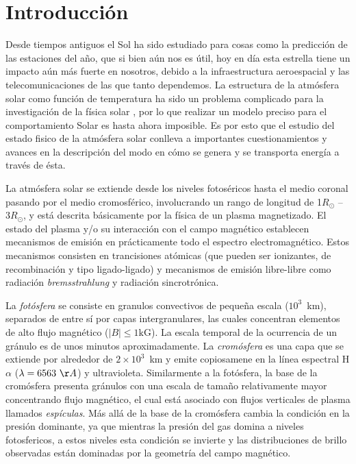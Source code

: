 \documentclass[9pt]{book}
\begin{document}
  \renewcommand{\thepage}{\arabic{page}}
  \setcounter{page}{1}
  \renewcommand{\tablename}{Tabla}

 \chapter{Introducci\'on}


Desde tiempos antiguos el Sol ha sido estudiado para cosas como la predicci\'on de las estaciones del a\~no, que si bien a\'un nos es \'util, hoy en d\'ia esta estrella tiene un impacto a\'un m\'as fuerte en nosotros, debido a la infraestructura aeroespacial y las telecomunicaciones de las que tanto dependemos. La estructura de la atm\'osfera solar como funci\'on de temperatura ha sido un problema complicado para la investigaci\'on de la f\'isica solar \cite{VAULT1}, por lo que realizar un modelo preciso para el comportamiento Solar es hasta ahora imposible. Es por esto que el estudio del estado fisico de la atm\'osfera solar conlleva a importantes cuestionamientos y avances en la descripci\'on del modo en c\'omo se genera y se transporta energ\'ia a trav\'es de \'esta.

La atm\'osfera solar se extiende desde los niveles fotos\'ericos hasta el medio coronal pasando por el medio cromosf\'erico, involucrando un rango de longitud de 1\(R_\odot\) -- 3\(R_\odot\), y est\'a descrita b\'asicamente por la f\'isica de un plasma magnetizado. El estado del plasma y/o su interacci\'on con el campo magn\'etico establecen mecanismos de emisi\'on en pr\'acticamente todo el espectro electromagn\'etico. Estos mecanismos consisten en trancisiones at\'omicas (que pueden ser ionizantes, de recombinaci\'on y tipo ligado-ligado) y mecanismos de emisi\'on libre-libre como radiaci\'on \emph{bremsstrahlung} y radiaci\'on sincrotr\'onica.

La \emph{fot\'osfera} se consiste en granulos convectivos de peque\~na escala ($10^3$~km), separados de entre s\'i por capas intergranulares, las cuales concentran elementos de alto flujo magn\'etico ($|B| \le 1\mbox{kG}$). La escala temporal de la ocurrencia de un gr\'anulo es de unos minutos aproximadamente. La \emph{crom\'osfera} es una capa que se extiende por alrededor de $2\times 10^3$~km y emite copiosamene en la l\'inea espectral H$\alpha$ ($\lambda=6563~\AA$) y ultravioleta. Similarmente a la fot\'osfera, la base de la crom\'osfera presenta gr\'anulos con una escala de tama\~no relativamente mayor concentrando flujo magn\'etico, el cual est\'a asociado con flujos verticales de plasma llamados \emph{esp\'iculas}. M\'as all\'a de la base de la crom\'osfera cambia la condici\'on en la presi\'on dominante, ya que mientras la presi\'on del gas domina a niveles fotosfericos, a estos niveles esta condici\'on se invierte y las distribuciones de brillo observadas est\'an dominadas por la geometr\'ia del campo magn\'etico.
\end{document}
